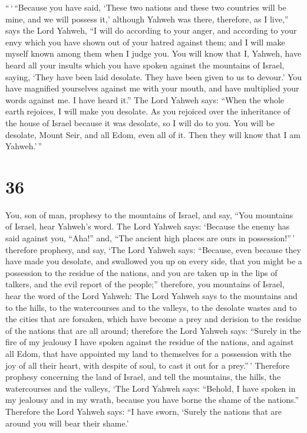 ``\,`\,``Because you have said, `These two nations and
these two countries will be mine, and we will possess it,' although
Yahweh was there,  therefore, as I live,'' says the Lord
Yahweh, ``I will do according to your anger, and according to your envy
which you have shown out of your hatred against them; and I will make
myself known among them when I judge you.  You will know
that I, Yahweh, have heard all your insults which you have spoken
against the mountains of Israel, saying, `They have been laid desolate.
They have been given to us to devour.'  You have
magnified yourselves against me with your mouth, and have multiplied
your words against me. I have heard it.''  The Lord
Yahweh says: ``When the whole earth rejoices, I will make you desolate.
 As you rejoiced over the inheritance of the house of
Israel because it was desolate, so I will do to you. You will be
desolate, Mount Seir, and all Edom, even all of it. Then they will know
that I am Yahweh.'\,''

\hypertarget{section-35}{%
\section{36}\label{section-35}}

 You, son of man, prophesy to the mountains of Israel, and
say, ``You mountains of Israel, hear Yahweh's word.  The
Lord Yahweh says: `Because the enemy has said against you, ``Aha!'' and,
``The ancient high places are ours in possession!''\,' 
therefore prophesy, and say, `The Lord Yahweh says: ``Because, even
because they have made you desolate, and swallowed you up on every side,
that you might be a possession to the residue of the nations, and you
are taken up in the lips of talkers, and the evil report of the
people;''  therefore, you mountains of Israel, hear the
word of the Lord Yahweh: The Lord Yahweh says to the mountains and to
the hills, to the watercourses and to the valleys, to the desolate
wastes and to the cities that are forsaken, which have become a prey and
derision to the residue of the nations that are all around;
 therefore the Lord Yahweh says: ``Surely in the fire of
my jealousy I have spoken against the residue of the nations, and
against all Edom, that have appointed my land to themselves for a
possession with the joy of all their heart, with despite of soul, to
cast it out for a prey.''\,'  Therefore prophesy
concerning the land of Israel, and tell the mountains, the hills, the
watercourses and the valleys, `The Lord Yahweh says: ``Behold, I have
spoken in my jealousy and in my wrath, because you have borne the shame
of the nations.''  Therefore the Lord Yahweh says: ``I
have sworn, `Surely the nations that are around you will bear their
shame.'

